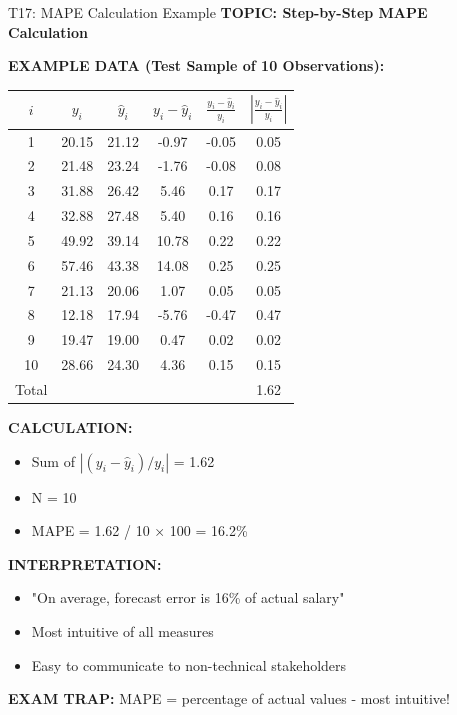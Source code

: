 \documentclass[8pt]{beamer}
\begin{document}
	\begin{frame}{T17: MAPE Calculation Example}
		\fontsize{6.5}{7.5}\selectfont
		\textbf{TOPIC: Step-by-Step MAPE Calculation}
		
		\vspace{0.1cm}
		\textbf{EXAMPLE DATA (Test Sample of 10 Observations):}
		
		\begin{tabular}{|c|c|c|c|c|c|}
			\hline
			$i$ & $y_i$ & $\hat{y}_i$ & $y_i - \hat{y}_i$ & $\frac{y_i - \hat{y}_i}{y_i}$ & $\left|\frac{y_i - \hat{y}_i}{y_i}\right|$ \\
			\hline
			1 & 20.15 & 21.12 & -0.97 & -0.05 & 0.05 \\
			2 & 21.48 & 23.24 & -1.76 & -0.08 & 0.08 \\
			3 & 31.88 & 26.42 & 5.46 & 0.17 & 0.17 \\
			4 & 32.88 & 27.48 & 5.40 & 0.16 & 0.16 \\
			5 & 49.92 & 39.14 & 10.78 & 0.22 & 0.22 \\
			6 & 57.46 & 43.38 & 14.08 & 0.25 & 0.25 \\
			7 & 21.13 & 20.06 & 1.07 & 0.05 & 0.05 \\
			8 & 12.18 & 17.94 & -5.76 & -0.47 & 0.47 \\
			9 & 19.47 & 19.00 & 0.47 & 0.02 & 0.02 \\
			10 & 28.66 & 24.30 & 4.36 & 0.15 & 0.15 \\
			\hline
			Total & & & & & 1.62 \\
			\hline
		\end{tabular}
		
		\vspace{0.1cm}
		\textbf{CALCULATION:}
		\begin{itemize}
			\item Sum of $|(y_i - \hat{y}_i)/y_i|$ = 1.62
			\item N = 10
			\item MAPE = 1.62 / 10 × 100 = 16.2\%
		\end{itemize}
		
		\vspace{0.1cm}
		\textbf{INTERPRETATION:}
		\begin{itemize}
			\item "On average, forecast error is 16\% of actual salary"
			\item Most intuitive of all measures
			\item Easy to communicate to non-technical stakeholders
		\end{itemize}
		
		\textcolor{myred}{\textbf{EXAM TRAP:}} MAPE = \textcolor{myblue}{percentage of actual values} - most intuitive!
	\end{frame}
	
\end{document}
